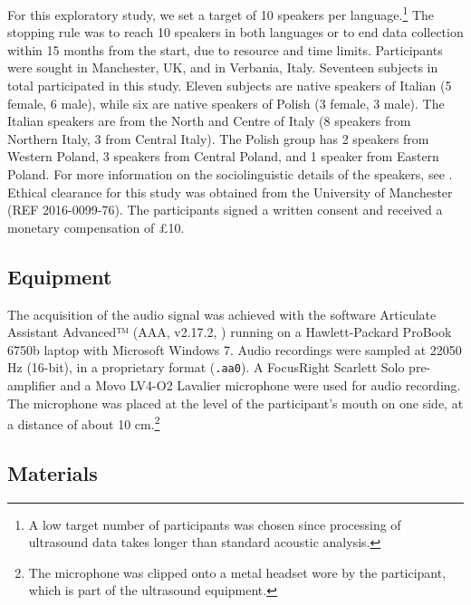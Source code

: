 \documentclass[12pt,]{article}
\let\rmarkdownfootnote\footnote%
\def\footnote{\protect\rmarkdownfootnote}
\begin{document}
For this exploratory study, we set a target of 10 speakers per
language.\footnote{A low target number of participants was chosen since processing of ultrasound data takes longer than standard acoustic analysis.
} The stopping rule was to reach 10 speakers in both languages or to end
data collection within 15 months from the start, due to resource and
time limits. Participants were sought in Manchester, UK, and in
Verbania, Italy. Seventeen subjects in total participated in this study.
Eleven subjects are native speakers of Italian (5 female, 6 male), while
six are native speakers of Polish (3 female, 3 male). The Italian
speakers are from the North and Centre of Italy (8 speakers from
Northern Italy, 3 from Central Italy). The Polish group has 2 speakers
from Western Poland, 3 speakers from Central Poland, and 1 speaker from
Eastern Poland. For more information on the sociolinguistic details of
the speakers, see . Ethical clearance for this study
was obtained from the University of Manchester (REF 2016-0099-76). The
participants signed a written consent and received a monetary
compensation of £10.

\hypertarget{equipment}{%
\subsection{Equipment}\label{equipment}}

The acquisition of the audio signal was achieved with the software
Articulate Assistant Advanced™ (AAA, v2.17.2, \citealt{articulate2011})
running on a Hawlett-Packard ProBook 6750b laptop with Microsoft Windows
7. Audio recordings were sampled at 22050 Hz (16-bit), in a proprietary
format (\texttt{.aa0}). A FocusRight Scarlett Solo pre-amplifier and a
Movo LV4-O2 Lavalier microphone were used for audio recording. The
microphone was placed at the level of the participant's mouth on one
side, at a distance of about 10
cm.\footnote{The microphone was clipped onto a metal headset wore by the participant, which is part of the ultrasound equipment.}

\hypertarget{materials}{%
\subsection{Materials}\label{materials}}

\label{s:materials}
\end{document}
